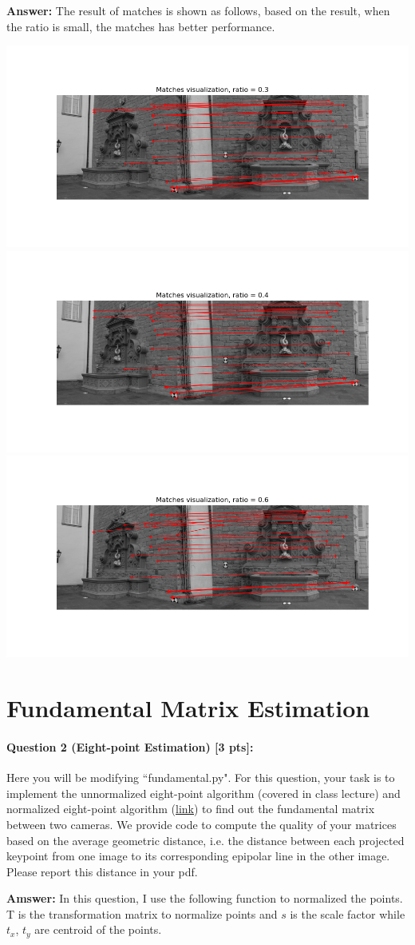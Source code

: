 \documentclass[11pt]{article}
\begin{document}
\textbf{Answer: } The result of matches is shown as follows, based on the result, when the ratio is small, the matches has better performance.
\begin{center}
    \small
    \includegraphics[width=0.3\linewidth]{fig/pic1ratio0.3.png}
    \includegraphics[width=0.3\linewidth]{fig/pic1ratio4.png}
    \includegraphics[width=0.3\linewidth]{fig/pic1ratio0.6.png}
\end{center}

\section*{Fundamental Matrix Estimation} 

\paragraph{Question 2 (Eight-point Estimation) [3 pts]:} Here you will be modifying ``fundamental.py". For this question, your task is to implement the unnormalized eight-point algorithm (covered in class lecture) and normalized eight-point algorithm (\href{https://en.wikipedia.org/wiki/Eight-point_algorithm#Normalized_algorithm}{link}) to find out the fundamental matrix between two cameras. We provide code to compute the quality of your matrices based on the average geometric distance, i.e. the distance between each projected keypoint from one image to its corresponding epipolar line in the other image. Please report this distance in your pdf.

\textbf{Amswer: } In this question, I use the following function to normalized the points. T is the transformation matrix to normalize points and $s$ is the scale factor while $t_x$, $t_y$ are centroid of the points.
\end{document}
